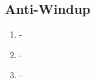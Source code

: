 \documentclass[a4paper,12pt]{article}
\begin{document}
\begin{enumerate}[resume]
			
	
		
	\end{enumerate}
	\subsection{Anti-Windup}
		\begin{enumerate}[resume]
			\item -
			\item -
			\item -
		\end{enumerate}

	
% 
\end{document}
